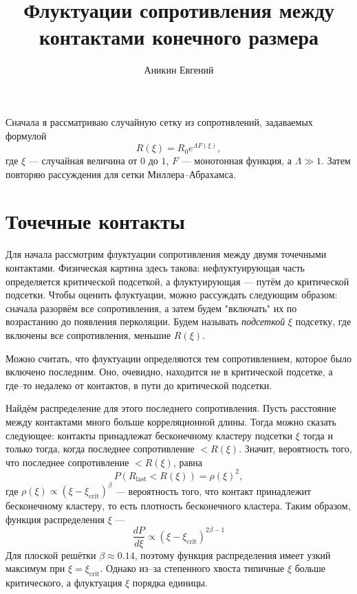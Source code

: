 \documentclass{article}
\title{Флуктуации сопротивления между контактами конечного размера}
\author{Аникин Евгений}
\begin{document}
\maketitle
Сначала я рассматриваю случайную сетку из сопротивлений, задаваемых формулой
\begin{equation}
    R(\xi) = R_0 e^{\Lambda F(\xi)},
\end{equation}
где $\xi$ --- случайная величина от $0$ до $1$, $F$ --- монотонная функция, а $\Lambda \gg 1$.
Затем повторяю рассуждения для сетки Миллера--Абрахамса.

\section{Точечные контакты}
Для начала рассмотрим флуктуации сопротивления между двумя точечными контактами. Физическая
картина здесь такова: нефлуктуирующая часть определяется критической подсеткой, а флуктуирующая
--- путём до критической подсетки. Чтобы оценить флуктуации, можно рассуждать следующим
образом: сначала разорвём все сопротивления, а затем будем "включать" их по возрастанию до 
появления перколяции. Будем называть \emph{подсеткой} $\xi$ подсетку, где включены
все сопротивления, меньшие $R(\xi)$. 

Можно считать, что флуктуации определяются тем сопротивлением, которое
было включено последним. Оно, очевидно, находится не в критической подсетке, а где--то
недалеко от контактов, в пути до критической подсетки.

Найдём распределение для этого последнего сопротивления. 
Пусть расстояние между контактами 
много больше корреляционной длины. Тогда можно сказать следующее: контакты принадлежат
бесконечному кластеру подсетки $\xi$ тогда и только тогда, когда последнее сопротивление
$< R(\xi)$. Значит, вероятность того, что последнее сопротивление $<R(\xi)$, равна 
\begin{equation}
    P(R_{\mathrm{last}} < R(\xi)) = \rho(\xi)^2,
\end{equation}
где $\rho(\xi) \propto (\xi - \xi_{\mathrm{crit}})^\beta$ --- вероятность того, что контакт 
принадлежит бесконечному кластеру, то есть плотность бесконечного кластера.
Таким образом, функция распределения $\xi$ ---
\begin{equation}
    \frac{dP}{d\xi} \propto (\xi - \xi_{\mathrm{crit}})^{2\beta - 1}
\end{equation}
Для плоской решётки $\beta \approx 0.14$, поэтому функция распределения имеет узкий максимум
при $\xi = \xi_\mathrm{crit}$. Однако из--за степенного хвоста типичные $\xi$ больше
критического, а флуктуация $\xi$ порядка единицы.
\end{document}

